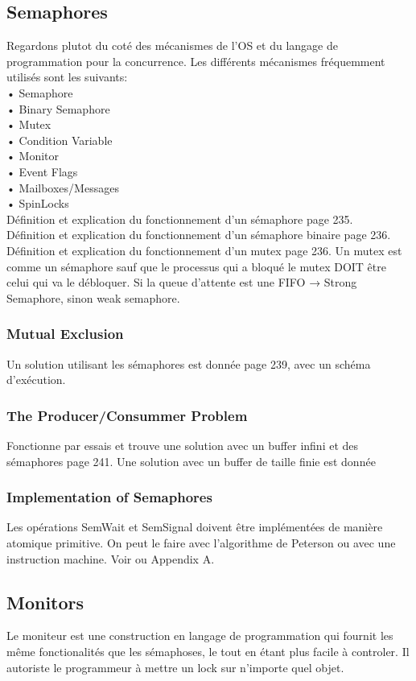 \subsection{Semaphores}
Regardons plutot du coté des mécanismes de l'OS et du langage de programmation pour la concurrence. Les différents mécanismes fréquemment utilisés sont les suivants: \\
• Semaphore \\
• Binary Semaphore \\
• Mutex \\
• Condition Variable \\
• Monitor \\
• Event Flags \\
• Mailboxes/Messages \\
• SpinLocks \\
Définition et explication du fonctionnement d'un sémaphore page 235. \\
Définition et explication du fonctionnement d'un sémaphore binaire page 236. Définition et explication du fonctionnement d'un mutex page 236. Un mutex est comme un sémaphore sauf que le processus qui a bloqué le mutex DOIT être celui qui va le débloquer.
Si la queue d'attente est une FIFO → Strong Semaphore, sinon weak semaphore.
\subsubsection{Mutual Exclusion}
Un solution utilisant les sémaphores est donnée page 239, avec un schéma d'exécution.
\subsubsection{The Producer/Consummer Problem}
Fonctionne par essais et trouve une solution avec un buffer infini et des sémaphores page 241.
Une solution avec un buffer de taille finie est donnée \cite[p.~243]{stallings}
\subsubsection{Implementation of Semaphores}
Les opérations SemWait et SemSignal doivent être implémentées de manière atomique primitive. On peut le faire avec l'algorithme de Peterson ou avec une instruction machine. Voir \cite[p.~245]{stallings} ou Appendix A.
\subsection{Monitors}
Le moniteur est une construction en langage de programmation qui fournit les même fonctionalités que les sémaphoses, le tout en étant plus facile à controler. Il autoriste le programmeur à mettre un lock sur n'importe quel objet.
